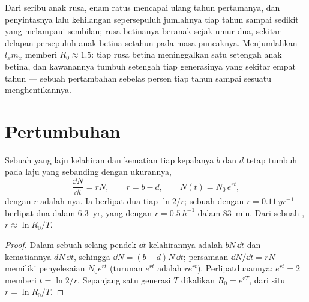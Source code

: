 \begin{example}\label{ex:b1:populations:deer}
Dari seribu anak rusa, enam ratus mencapai ulang tahun pertamanya, dan
penyintasnya lalu kehilangan sepersepuluh jumlahnya tiap tahun sampai
sedikit yang melampaui sembilan; rusa betinanya beranak sejak umur
dua, sekitar delapan persepuluh anak betina setahun pada masa
puncaknya. Menjumlahkan $l_x m_x$ memberi $R_0 \approx 1.5$: tiap rusa
betina meninggalkan satu setengah anak betina, dan kawanannya tumbuh
setengah tiap generasinya yang sekitar empat tahun --- sebuah
pertambahan sebelas persen tiap tahun sampai sesuatu menghentikannya.
\end{example}

\section{Pertumbuhan}

\begin{theorem}\label{thm:b1:populations:exponential}
Sebuah  yang laju kelahiran dan kematian tiap kepalanya $b$
dan $d$ tetap tumbuh pada laju yang sebanding dengan ukurannya,
\[
\frac{\dd N}{\dd t} = rN, \qquad r = b - d, \qquad N(t) = N_0\,e^{rt},
\]
dengan $r$ adalah \emph{}nya. Ia berlipat
dua tiap $\ln 2/r$; sebuah  dengan $r = \qty{0.11}{yr^{-1}}$
berlipat dua dalam \qty{6.3}{yr}, yang dengan $r = \qty{0.5}{h^{-1}}$
dalam \qty{83}{min}. Dari sebuah , $r \approx \ln R_0 / T$.
\end{theorem}
\begin{proof}
Dalam sebuah selang pendek $\dd t$ kelahirannya adalah $bN\,\dd t$ dan
kematiannya $dN\,\dd t$, sehingga $\dd N = (b - d)N\,\dd t$;
persamaan $\dd N/\dd t = rN$ memiliki penyelesaian $N_0 e^{rt}$
(turunan $e^{rt}$ adalah $re^{rt}$). Perlipatduaannya: $e^{rt} = 2$
memberi $t = \ln 2/r$. Sepanjang satu generasi $T$ 
dikalikan $R_0 = e^{rT}$, dari situ $r = \ln R_0/T$.
\end{proof}

